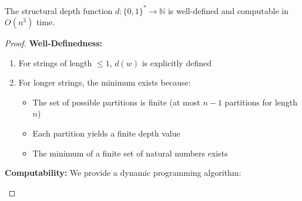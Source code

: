 \begin{lemma}
The structural depth function $d: \{0,1\}^* \to \mathbb{N}$ is well-defined and computable in $O(n^3)$ time.
\end{lemma}

\begin{proof}
\textbf{Well-Definedness:}
\begin{enumerate}
\item For strings of length $\leq 1$, $d(w)$ is explicitly defined
\item For longer strings, the minimum exists because:
  \begin{itemize}
  \item The set of possible partitions is finite (at most $n-1$ partitions for length $n$)
  \item Each partition yields a finite depth value
  \item The minimum of a finite set of natural numbers exists
  \end{itemize}
\end{enumerate}

\textbf{Computability:}
We provide a dynamic programming algorithm:

\begin{figure}[ht]
\end{figure}


\end{proof}
